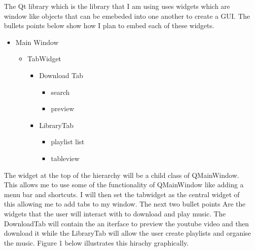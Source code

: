 \documentclass{article}
\begin{document}
The Qt library which is the library that I am using uses widgets which are window
like objects that can be emebeded into one another to create a GUI. The bullets 
points below show how I plan to embed each of these widgets.

\begin{itemize}
    \item Main Window
        \begin{itemize}
            \item TabWidget
                \begin{itemize}
                    \item Download Tab
                        \begin{itemize}
                            \item search
                            \item preview
                        \end{itemize}
                    \item LibraryTab
                        \begin{itemize}
                            \item playlist list
                            \item tableview
                        \end{itemize}
                \end{itemize}
        \end{itemize}

\end{itemize}

The widget at the top of the hierarchy will be a child class of QMainWindow. This
allows me to use some of the functionality of QMainWindow like adding a menu bar
and shortcuts. I will then set the tabwidget as the central widget of this
allowing me to add tabs to my window. The next two bullet points Are the widgets
that the user will interact with to download and play music. The DownloadTab will
contain the an iterface to preview the youtube video and then download it while
the LibraryTab will allow the user create playlists and organise the music. Figure 1
below illustrates this hirachy graphically.
\end{document}
